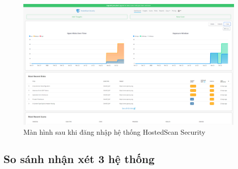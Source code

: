 \begin{figure}[H]
    \centering
    \includegraphics[width=\textwidth]{applied-thesis-chapters/chapter-1/hostedscan.com_dashboard.png}
    \caption{Màn hình sau khi đăng nhập hệ thống HostedScan Security}
\end{figure}

\subsection{So sánh nhận xét 3 hệ thống}

